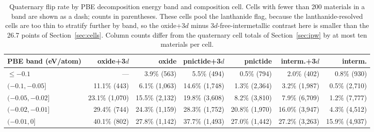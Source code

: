 \documentclass[11pt]{article}
\begin{document}
\begin{table}[htbp]\centering
\caption{Quaternary flip rate by PBE decomposition energy band and composition cell.
Cells with fewer than 200 materials in a band are shown as a dash; counts in
parentheses. These
cells pool the lanthanide flag, because the lanthanide-resolved cells are too thin to
stratify further by band, so the oxide+3$d$ minus 3$d$-free-intermetallic contrast here is
smaller than the 26.7 points of Section~\ref{sec:cells}. Column counts differ from the quaternary cell totals of Section~\ref{sec:ipw} by at
most ten materials per cell.}
\label{tab:hulldist}
\footnotesize\setlength{\tabcolsep}{3pt}
\begin{tabular}{lrrrrrr}
\toprule
PBE band (eV/atom) & oxide+3$d$ & oxide & pnictide+3$d$ & pnictide & interm.+3$d$ & interm. \\
\midrule
$\le-0.1$ & --- & 3.9\% (563) & 5.5\% (494) & 0.5\% (794) & 2.0\% (402) & 0.8\% (930) \\
$(-0.1,-0.05]$ & 11.1\% (443) & 6.1\% (1{,}063) & 14.6\% (1{,}748) & 1.3\% (2{,}364) & 3.2\% (1{,}987) & 0.5\% (2{,}710) \\
$(-0.05,-0.02]$ & 23.1\% (1{,}070) & 15.5\% (2{,}132) & 19.8\% (3{,}608) & 8.2\% (3{,}810) & 7.9\% (6{,}709) & 1.2\% (7{,}777) \\
$(-0.02,-0.01]$ & 29.4\% (744) & 24.3\% (1{,}159) & 28.3\% (1{,}752) & 20.8\% (1{,}970) & 16.0\% (3{,}947) & 4.3\% (4{,}512) \\
$(-0.01,0]$ & 40.1\% (802) & 27.8\% (1{,}142) & 37.7\% (1{,}493) & 27.0\% (1{,}442) & 27.2\% (3{,}263) & 15.9\% (4{,}937) \\
\bottomrule
\end{tabular}
\end{table}
\end{document}
